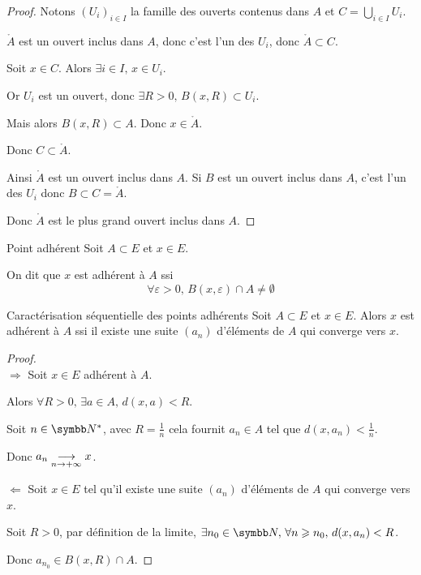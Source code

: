 \begin{proof}
    Notons $(U_i)_{i \in I}$ la famille des ouverts contenus dans $A$
    et $C = \bigcup_{i \in I} U_i$.

    $\mathring A$ est un ouvert inclus dans $A$, donc c'est l'un des $U_i$, donc $\mathring A \subset C$.

    Soit $x \in C$. Alors $\exists i \in I, \, x \in U_i$.

    Or $U_i$ est un ouvert, donc $\exists R > 0, \, B(x, R) \subset U_i$. 

    Mais alors $B(x, R) \subset A$. Donc $x \in \mathring A$.

    Donc $C \subset \mathring A$.

    Ainsi $\mathring A$ est un ouvert inclus dans $A$. Si $B$ est un ouvert inclus dans 
    $A$, c'est l'un des $U_i$ donc $B \subset C = \mathring A$.

    Donc $\mathring A$ est le plus grand ouvert inclus dans $A$.
\end{proof}

\begin{definition}{Point adhérent}{}
    Soit $A \subset E$ et $x \in E$.

    On dit que $x$ est adhérent à $A$ ssi 
    \[\forall \varepsilon > 0, \, B(x, \varepsilon) \cap A \neq \emptyset\]
\end{definition}

\begin{theoreme}{Caractérisation séquentielle des points adhérents}{}
    Soit $A \subset E$ et $x \in E$.
    Alors $x$ est adhérent à $A$ ssi il existe une suite $(a_n)$ d'éléments de $A$ 
    qui converge vers $x$.
\end{theoreme}

\begin{proof}~\\
    $\Rightarrow$ Soit $x \in E$ adhérent à $A$. 

    Alors $\forall R > 0, \, \exists a \in A, \, d(x, a) < R$.

    Soit $n \in \N^*$, avec $R = \frac 1 n$ cela fournit $a_n \in A$ tel que $d(x, a_n) < \frac 1 n$.

    Donc $a_n \underset{n \to + \infty}{\longrightarrow} x$.

    $\Leftarrow$ Soit $x \in E$ tel qu'il existe une suite $(a_n)$ d'éléments 
    de $A$ qui converge vers $x$. 

    Soit $R > 0$, par définition de la limite, $\exists n_0 \in \N, \, \forall n \geqslant n_0, \, d(x, a_n) < R$.

    Donc $a_{n_0} \in B(x, R) \cap A$. 
\end{proof}

